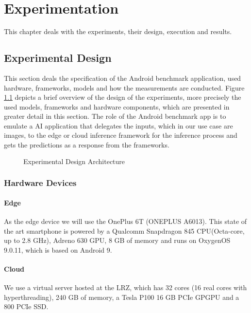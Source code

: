\chapter{Experimentation}
\label{chap:experiments}
This chapter deals with the experiments, their design, execution and results.

 
\section{Experimental Design}
This section deals the specification of the Android benchmark application, used hardware, frameworks, models and how the measurements are conducted. 
Figure \ref{fig:expDesign} depicts a brief overview of the design of the experiments, more precisely the used models, frameworks and hardware components, which are presented in greater detail in this section.
The role of the Android benchmark app is to emulate a AI application that delegates the inputs, which in our use case are images, to the edge or cloud inference framework for the inference process and gets the predictions as a response from the frameworks.

\begin{figure}[H]
\centering
\resizebox{.95\linewidth}{!}{}
\caption{Experimental Design Architecture}
\label{fig:expDesign}
\end{figure}


\subsection{Hardware Devices}
\subsubsection{Edge}
\label{chap:hardwareEdge}
As the edge device we will use the OnePlus 6T (ONEPLUS A6013). This state of the art smartphone is powered by a Qualcomm Snapdragon 845 CPU(Octa-core, up to 2.8 GHz), Adreno 630 GPU, 8 GB of memory and runs on OxygenOS 9.0.11, which is based on Android 9.
\subsubsection{Cloud}
We use a virtual server hosted at the LRZ, which has 32 cores (16 real cores with hyperthreading), 240 GB of memory, a Tesla P100 16 GB PCIe GPGPU and a 800 PCIe SSD.

